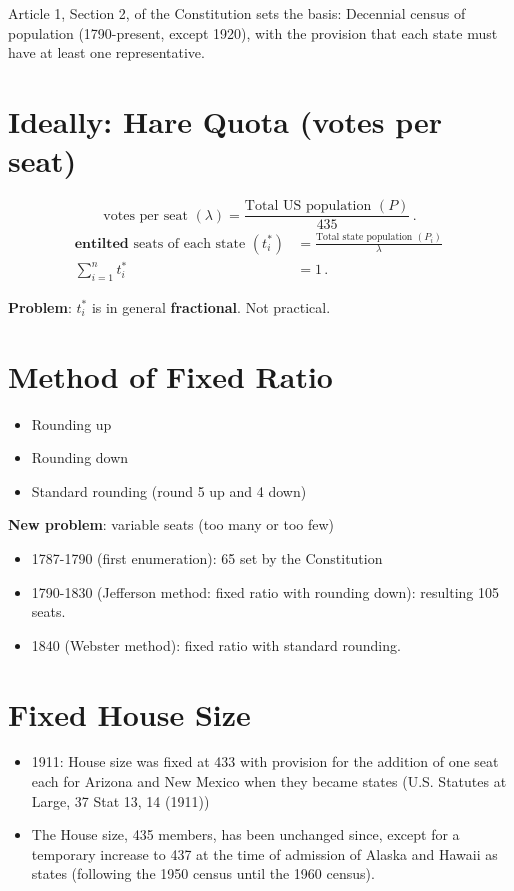 \documentclass[
  letterpaper,
  DIV=11,
  numbers=noendperiod]{scrreprt}
\providecommand{\tightlist}{%
  \setlength{\itemsep}{0pt}\setlength{\parskip}{0pt}}\usepackage{longtable,booktabs,array}
\begin{document}
Article 1, Section 2, of the Constitution sets the basis: Decennial
census of population (1790-present, except 1920), with the provision
that each state must have at least one representative.

\section{Ideally: Hare Quota (votes per
seat)}\label{ideally-hare-quota-votes-per-seat}

\[
\text{votes per seat }(\lambda)= \frac{\text{Total US population }(P)}{435}\,.
\] \[
\begin{aligned}
\textbf{entilted} \text{ seats of each state }(t^*_i)&= \frac{\text{Total state population }(P_i)}{\lambda}\,\\
\sum_{i=1}^n{t^*_i}&=1\,.
\end{aligned}
\]

\textbf{Problem}: \(t^*_i\) is in general \textbf{fractional}. Not
practical.

\section{Method of Fixed Ratio}\label{method-of-fixed-ratio}

\begin{itemize}
\tightlist
\item
  Rounding up
\item
  Rounding down
\item
  Standard rounding (round 5 up and 4 down)
\end{itemize}

\textbf{New problem}: variable seats (too many or too few)

\begin{itemize}
\item
  1787-1790 (first enumeration): 65 set by the Constitution
\item
  1790-1830 (Jefferson method: fixed ratio with rounding down):
  resulting 105 seats.
\item
  1840 (Webster method): fixed ratio with standard rounding.
\end{itemize}

\section{Fixed House Size}\label{fixed-house-size}

\begin{itemize}
\tightlist
\item
  1911: House size was fixed at 433 with provision for the addition of
  one seat each for Arizona and New Mexico when they became states (U.S.
  Statutes at Large, 37 Stat 13, 14 (1911))
\item
  The House size, 435 members, has been unchanged since, except for a
  temporary increase to 437 at the time of admission of Alaska and
  Hawaii as states (following the 1950 census until the 1960 census).
\end{itemize}
\end{document}
